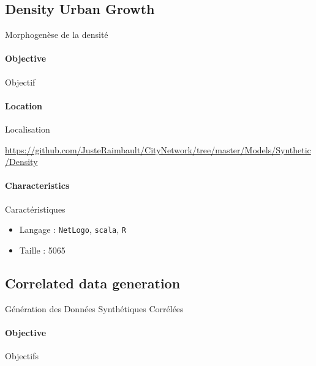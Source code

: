 

\subsection{Density Urban Growth}{Morphogenèse de la densité}

\paragraph{Objective}{Objectif}


\paragraph{Location}{Localisation}

\url{https://github.com/JusteRaimbault/CityNetwork/tree/master/Models/Synthetic/Density}

\paragraph{Characteristics}{Caractéristiques}

\begin{itemize}
\item Langage : \texttt{NetLogo}, \texttt{scala}, \texttt{R}
\item Taille : 5065
\end{itemize}





\subsection{Correlated data generation}{Génération des Données Synthétiques Corrélées}

\paragraph{Objective}{Objectifs}



